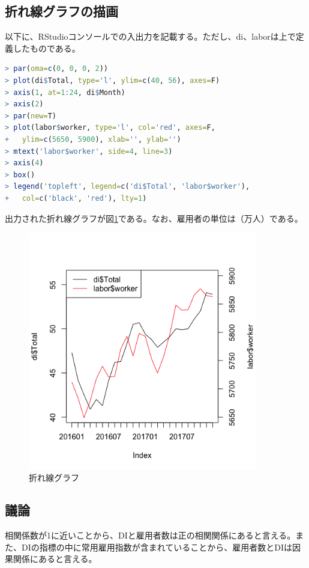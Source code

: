 \documentclass{jsarticle}
\begin{document}
\subsection{折れ線グラフの描画}

以下に、RStudioコンソールでの入出力を記載する。ただし、di、laborは上で定義したものである。

\begin{lstlisting}[language=r]
> par(oma=c(0, 0, 0, 2))
> plot(di$Total, type='l', ylim=c(40, 56), axes=F)
> axis(1, at=1:24, di$Month)
> axis(2)
> par(new=T)
> plot(labor$worker, type='l', col='red', axes=F,
+   ylim=c(5650, 5900), xlab='', ylab='')
> mtext('labor$worker', side=4, line=3)
> axis(4)
> box()
> legend('topleft', legend=c('di$Total', 'labor$worker'),
+   col=c('black', 'red'), lty=1)
\end{lstlisting}

出力された折れ線グラフが図\ref{ex5}である。なお、雇用者の単位は（万人）である。

\begin{figure}[H]
 \centering
   \includegraphics[width=100mm]{figures/ex5.png}
 \caption{折れ線グラフ}
 \label{ex5}
\end{figure}

\subsection{議論}

相関係数が1に近いことから、DIと雇用者数は正の相関関係にあると言える。また、DIの指標の中に常用雇用指数が含まれていることから、雇用者数とDIは因果関係にあると言える。
\end{document}
